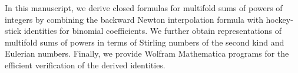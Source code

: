 In this manuscript, we derive closed formulas for multifold sums of powers of integers by combining the backward Newton interpolation formula with hockey-stick identities for binomial coefficients. We further obtain representations of multifold sums of powers in terms of Stirling numbers of the second kind and Eulerian numbers. Finally, we provide Wolfram Mathematica programs for the efficient verification of the derived identities.
